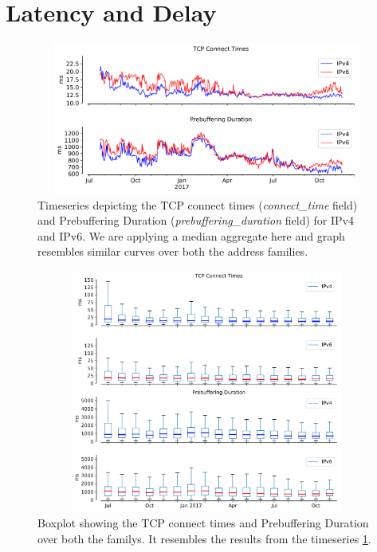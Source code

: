\FloatBarrier
\section{Latency and Delay}\label{chapter:tcppd}
\begin{figure}[!ht]
	\centering
	\includegraphics[keepaspectratio, height=5cm, width=15cm]{figures/tcp/netflix-tcp-pd-timeseries-separate.pdf}
	\caption[Connect Time and Prebuffering Duration for IPv4 and IPv6 Timeseries]{Timeseries depicting the TCP connect times (\textit{connect\_time} field) and Prebuffering Duration (\textit{prebuffering\_duration} field) for IPv4 and IPv6. We are applying a median aggregate here and graph resembles similar curves over both the address families.}
	\label{fig:Connect Time and Prebuffering Duration for IPv4 and IPv6 Timeseries}
\end{figure}
\begin{figure}[!ht]
	\centering
	\includegraphics[keepaspectratio, height=8cm, width=15cm]{figures/tcp/netflix-delay-boxplot-separate.pdf}
	\caption[TCP Connect Times and Prebuffering Duration Boxplot Separate]{Boxplot showing the TCP connect times and Prebuffering Duration over both the familys. It resembles the results from the timeseries \cref{fig:Connect Time and Prebuffering Duration for IPv4 and IPv6 Timeseries}.}
	\label{fig:Connect Times and Prebuffering Duration for IPv4 and IPv6 Boxplot}
\end{figure}
